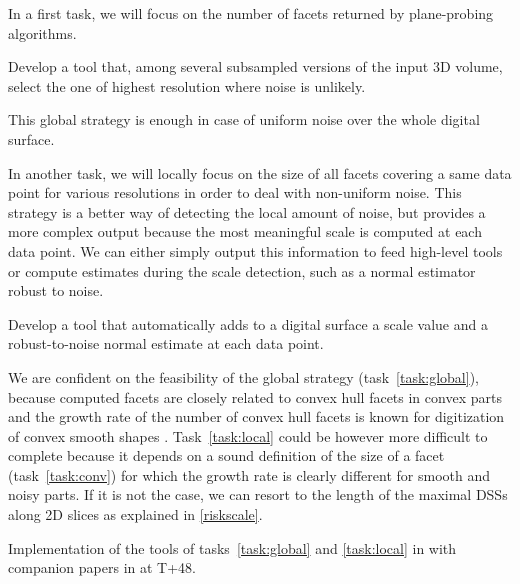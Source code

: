 
In a first task, we will focus on the number of facets returned by plane-probing algorithms.

\begin{Task}
  \label{task:global}
  Develop a tool that, among several subsampled versions of the input 3D volume,
  select the one of highest resolution where noise is unlikely.
\end{Task}

This global strategy is enough in case of uniform noise over the whole digital surface.  

In another task, we will locally focus on the size of all facets covering a same data point
for various resolutions in order to deal with non-uniform noise. 
This strategy is a better way of detecting the local amount of noise,
but provides a more complex output because the most meaningful scale is
computed at each data point.
We can either simply output this information to feed high-level tools
or compute estimates during the scale detection, such as a normal estimator
robust to noise.  

\begin{Task}
  \label{task:local}
  Develop a tool that automatically adds to a digital surface a scale value and
  a robust-to-noise normal estimate at each data point. 
\end{Task}

\Risks
We are confident on the feasibility of the global strategy (task~\ref{task:global}),
because computed facets are closely related to convex hull facets in convex parts
and the growth rate of the number of convex hull facets is known for digitization
of convex smooth shapes \cite{Barany1998}. 
Task~\ref{task:local} could be however more difficult to complete
because it depends on a sound definition of the size of a facet (task~\ref{task:conv})
for which the growth rate is clearly different for smooth and noisy parts. If it is
not the case, we can resort to the length of the maximal DSSs along 2D slices
as explained in \ref{riskscale}.

\Success
  Implementation of the tools of tasks~\ref{task:global} and \ref{task:local}
    in {\DGtalTools} with companion papers in {\IPOL} at T+48.

